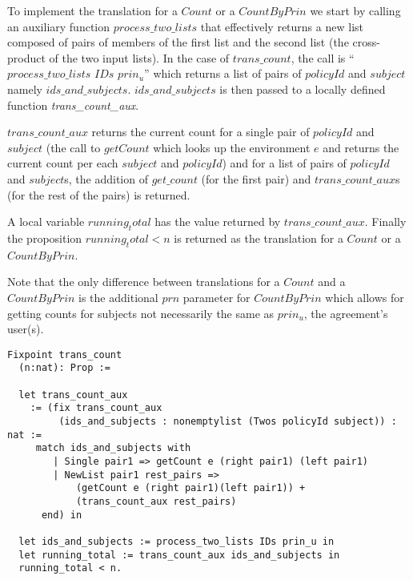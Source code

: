 To implement the translation for a $Count$ or a $CountByPrin$ we start by calling an auxiliary function $process\_two\_lists$ that effectively returns a new list composed of pairs of members of the first list and the second list (the cross-product of the two input lists). In the case of $trans\_count$, the call is ``$process\_two\_lists$ $IDs$ $prin_u$'' which returns a list of pairs of $policyId$ and $subject$ namely $ids\_and\_subjects$. $ids\_and\_subjects$ is then passed to a locally defined function \emph{trans_count_aux}.

$trans\_count\_aux$ returns the current count for a single pair of $policyId$ and $subject$ (the call to $getCount$ which looks up the environment $e$ and returns the current count per each $subject$ and $policyId$) and for a list of pairs of $policyId$ and $subject$s, the addition of $get\_count$ (for the first pair) and $trans\_count\_aux$s (for the rest of the pairs) is returned. 

A local variable $running_total$ has the value returned by $trans\_count\_aux$. Finally the proposition $running_total < n$ is returned as the translation for a $Count$ or a $CountByPrin$.

Note that the only difference between translations for a $Count$ and a $CountByPrin$ is the additional $prn$ parameter for $CountByPrin$ which allows for getting counts for subjects not necessarily the same as $prin_{u}$, the agreement's user(s).


\begin{minipage}[c]{0.95\textwidth}
\begin{lstlisting}
Fixpoint trans_count 
  (n:nat): Prop := 

  let trans_count_aux 
    := (fix trans_count_aux
         (ids_and_subjects : nonemptylist (Twos policyId subject)) : nat :=
     match ids_and_subjects with
        | Single pair1 => getCount e (right pair1) (left pair1)
        | NewList pair1 rest_pairs =>
            (getCount e (right pair1)(left pair1)) +
            (trans_count_aux rest_pairs)
      end) in
  
  let ids_and_subjects := process_two_lists IDs prin_u in
  let running_total := trans_count_aux ids_and_subjects in
  running_total < n.
\end{lstlisting}
\end{minipage}

